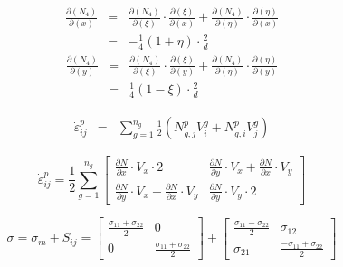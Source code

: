 \documentclass[fontset=windows]{ctexart}
\begin{document}
\begin{center}
	\begin{eqnarray}
		\frac{\partial(N_4)}{\partial(x)} &=& \frac{\partial(N_4)}{\partial(\xi)}\cdot \frac{\partial(\xi)}{\partial(x)}+\frac{\partial(N_4)}{\partial(\eta)}\cdot\frac{\partial(\eta)}{\partial(x)}  \nonumber    \\
		~&=& -\frac{1}{4}(1+\eta)\cdot\frac{2}{d} \nonumber
	\end{eqnarray}
	\begin{eqnarray}
		\frac{\partial(N_4)}{\partial(y)} &=& \frac{\partial(N_4)}{\partial(\xi)}\cdot \frac{\partial(\xi)}{\partial(y)}+\frac{\partial(N_4)}{\partial(\eta)}\cdot\frac{\partial(\eta)}{\partial(y)}  \nonumber    \\
		~&=& \frac{1}{4}(1-\xi)\cdot\frac{2}{d} \nonumber
	\end{eqnarray}

	\begin{eqnarray}
		\dot{\varepsilon}_{ij}^p &=& \sum_{g = 1}^{n_g} \frac{1}{2} (N_{g,j}^p V_i^g+N_{g,i}^p V_j^g) \nonumber
	\end{eqnarray}

	\begin{equation}
		\dot{\varepsilon}_{ij}^p = \frac{1}{2}\sum_{g=1}^{n_g}{
		\left[\begin{array}{cc}
				{\frac{\partial{N}}{\partial{x}}\cdot V_x \cdot 2}                                    & {\frac{\partial{N}}{\partial{y}}\cdot V_x}+{\frac{\partial{N}}{\partial{x}}\cdot V_y} \\
				{\frac{\partial{N}}{\partial{y}}\cdot V_x}+{\frac{\partial{N}}{\partial{x}}\cdot V_y} & {\frac{\partial{N}}{\partial{y}}\cdot V_y \cdot 2}
			\end{array}
			\right ]} \nonumber
	\end{equation}

	\begin{equation}
		\sigma = \sigma_m + S_{ij} = {
				\left[\begin{array}{cc}
						\frac{\sigma_{11}+\sigma_{22}}{2} & 0                                 \\
						0                                 & \frac{\sigma_{11}+\sigma_{22}}{2}
					\end{array}
					\right ]} + {
		\left[\begin{array}{cc}
				\frac{\sigma_{11}-\sigma_{22}}{2} & \sigma_{12}                        \\
				\sigma_{21}                       & \frac{-\sigma_{11}+\sigma_{22}}{2}
			\end{array}
			\right ]}\nonumber
	\end{equation}


\end{center}
\end{document}
